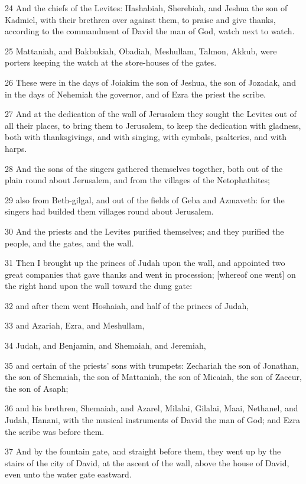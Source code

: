 \par 24 And the chiefs of the Levites: Hashabiah, Sherebiah, and Jeshua the son of Kadmiel, with their brethren over against them, to praise and give thanks, according to the commandment of David the man of God, watch next to watch.
\par 25 Mattaniah, and Bakbukiah, Obadiah, Meshullam, Talmon, Akkub, were porters keeping the watch at the store-houses of the gates.
\par 26 These were in the days of Joiakim the son of Jeshua, the son of Jozadak, and in the days of Nehemiah the governor, and of Ezra the priest the scribe.
\par 27 And at the dedication of the wall of Jerusalem they sought the Levites out of all their places, to bring them to Jerusalem, to keep the dedication with gladness, both with thanksgivings, and with singing, with cymbals, psalteries, and with harps.
\par 28 And the sons of the singers gathered themselves together, both out of the plain round about Jerusalem, and from the villages of the Netophathites;
\par 29 also from Beth-gilgal, and out of the fields of Geba and Azmaveth: for the singers had builded them villages round about Jerusalem.
\par 30 And the priests and the Levites purified themselves; and they purified the people, and the gates, and the wall.
\par 31 Then I brought up the princes of Judah upon the wall, and appointed two great companies that gave thanks and went in procession; [whereof one went] on the right hand upon the wall toward the dung gate:
\par 32 and after them went Hoshaiah, and half of the princes of Judah,
\par 33 and Azariah, Ezra, and Meshullam,
\par 34 Judah, and Benjamin, and Shemaiah, and Jeremiah,
\par 35 and certain of the priests' sons with trumpets: Zechariah the son of Jonathan, the son of Shemaiah, the son of Mattaniah, the son of Micaiah, the son of Zaccur, the son of Asaph;
\par 36 and his brethren, Shemaiah, and Azarel, Milalai, Gilalai, Maai, Nethanel, and Judah, Hanani, with the musical instruments of David the man of God; and Ezra the scribe was before them.
\par 37 And by the fountain gate, and straight before them, they went up by the stairs of the city of David, at the ascent of the wall, above the house of David, even unto the water gate eastward.
